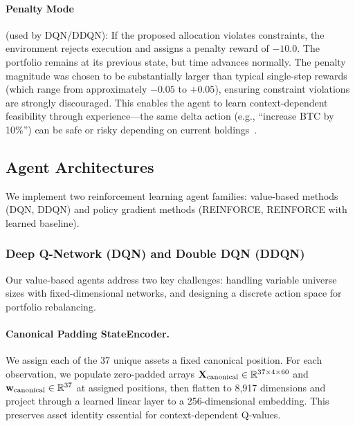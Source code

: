 \paragraph{Penalty Mode} (used by DQN/DDQN): If the proposed allocation violates constraints, the environment rejects execution and assigns a penalty reward of $-10.0$. The portfolio remains at its previous state, but time advances normally. The penalty magnitude was chosen to be substantially larger than typical single-step rewards (which range from approximately $-0.05$ to $+0.05$), ensuring constraint violations are strongly discouraged. This enables the agent to learn context-dependent feasibility through experience---the same delta action (e.g., ``increase BTC by 10\%'') can be safe or risky depending on current holdings~\citep{lucarelli2020dqlcrypto}.

\subsection{Agent Architectures}
\label{sec:agents}

We implement two reinforcement learning agent families: value-based methods (DQN, DDQN) and policy gradient methods (REINFORCE, REINFORCE with learned baseline).

\subsubsection{Deep Q-Network (DQN) and Double DQN (DDQN)}
\label{sec:dqn}

Our value-based agents address two key challenges: handling variable universe sizes with fixed-dimensional networks, and designing a discrete action space for portfolio rebalancing.

\paragraph{Canonical Padding StateEncoder.}
We assign each of the 37 unique assets a fixed canonical position. For each observation, we populate zero-padded arrays $\mathbf{X}_{\text{canonical}} \in \mathbb{R}^{37 \times 4 \times 60}$ and $\mathbf{w}_{\text{canonical}} \in \mathbb{R}^{37}$ at assigned positions, then flatten to 8,917 dimensions and project through a learned linear layer to a 256-dimensional embedding. This preserves asset identity essential for context-dependent Q-values.


